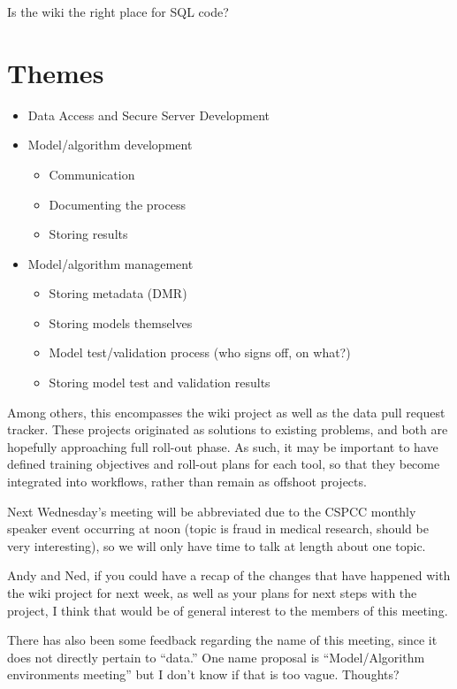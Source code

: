 \documentclass{tufte-handout}
\begin{document}
Is the wiki the right place for SQL code?

\section{Themes}

\begin{itemize}
\item Data Access and Secure Server Development
\item Model/algorithm development

\begin{itemize}
\item Communication
\item Documenting the process
\item Storing results
\end{itemize}

\item Model/algorithm management

\begin{itemize}
\item Storing metadata (DMR)
\item Storing models themselves
\item Model test/validation process (who signs off, on what?)
\item Storing model test and validation results
\end{itemize}
\end{itemize}

Among others, this encompasses the wiki project as well as the data
pull request tracker. These projects originated as solutions to
existing problems, and both are hopefully approaching full roll-out
phase. As such, it may be important to have defined training
objectives and roll-out plans for each tool, so that they become
integrated into workflows, rather than remain as offshoot projects.
 
Next Wednesday's meeting will be abbreviated due to the CSPCC monthly
speaker event occurring at noon (topic is fraud in medical research,
should be very interesting), so we will only have time to talk at
length about one topic.
 
Andy and Ned, if you could have a recap of the changes that have
happened with the wiki project for next week, as well as your plans
for next steps with the project, I think that would be of general
interest to the members of this meeting.
 
There has also been some feedback regarding the name of this meeting,
since it does not directly pertain to ``data.'' One name proposal is
``Model/Algorithm environments meeting'' but I don't know if that is
too vague. Thoughts?
\end{document}
